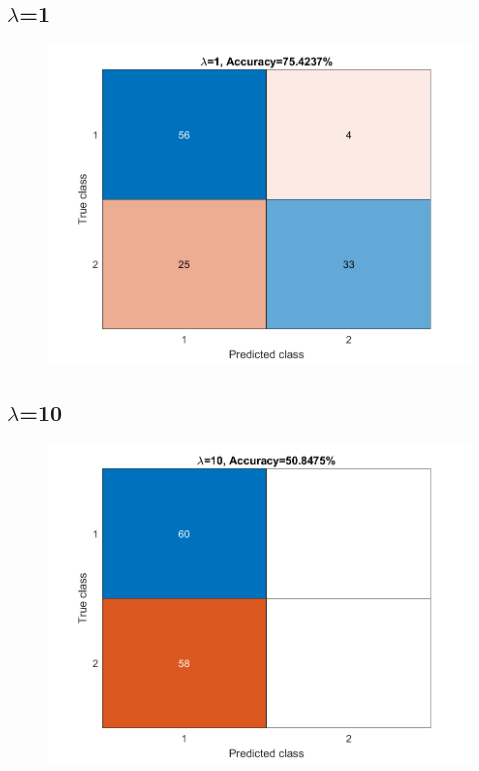 \documentclass{article}
\begin{document}
\subsection*{{$\lambda$}=1}


\begin{figure}[H]
\includegraphics[scale = 0.75]{hwk4_problem3_lambda_1_plot.png}
\end{figure}

\subsection*{{$\lambda$}=10}


\begin{figure}[H]
\includegraphics[scale = 0.75]{hwk4_problem3_lambda_10_plot.png}
\end{figure}
\end{document}
